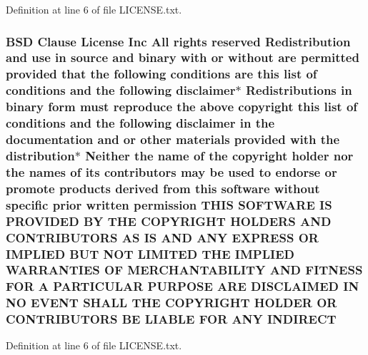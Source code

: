 Definition at line 6 of file L\+I\+C\+E\+N\+S\+E.\+txt.

\subsubsection[{\texorpdfstring{I\+N\+D\+I\+R\+E\+CT}{INDIRECT}}]{\setlength{\rightskip}{0pt plus 5cm}B\+SD Clause License Inc All rights reserved Redistribution and use in source and binary with or without are permitted provided that the following conditions are this list of conditions and the following disclaimer$\ast$ Redistributions in binary form must reproduce the above copyright this list of conditions and the following disclaimer in the documentation and or other materials provided with the distribution$\ast$ Neither the name of the copyright holder nor the names of its contributors may be used to endorse or promote products derived from this software without specific prior written permission T\+H\+IS S\+O\+F\+T\+W\+A\+RE IS P\+R\+O\+V\+I\+D\+ED BY T\+HE C\+O\+P\+Y\+R\+I\+G\+HT H\+O\+L\+D\+E\+RS A\+ND C\+O\+N\+T\+R\+I\+B\+U\+T\+O\+RS AS IS A\+ND A\+NY E\+X\+P\+R\+E\+SS OR I\+M\+P\+L\+I\+ED B\+UT N\+OT L\+I\+M\+I\+T\+ED T\+HE I\+M\+P\+L\+I\+ED {\bf W\+A\+R\+R\+A\+N\+T\+I\+ES} OF M\+E\+R\+C\+H\+A\+N\+T\+A\+B\+I\+L\+I\+TY A\+ND F\+I\+T\+N\+E\+SS F\+OR A P\+A\+R\+T\+I\+C\+U\+L\+AR P\+U\+R\+P\+O\+SE A\+RE D\+I\+S\+C\+L\+A\+I\+M\+ED IN NO E\+V\+E\+NT S\+H\+A\+LL T\+HE C\+O\+P\+Y\+R\+I\+G\+HT H\+O\+L\+D\+ER OR C\+O\+N\+T\+R\+I\+B\+U\+T\+O\+RS BE L\+I\+A\+B\+LE F\+OR A\+NY I\+N\+D\+I\+R\+E\+CT}\hypertarget{LICENSE_8txt_ad848f8b0223259d90a9efbe70f847522}{}\label{LICENSE_8txt_ad848f8b0223259d90a9efbe70f847522}


Definition at line 6 of file L\+I\+C\+E\+N\+S\+E.\+txt.


